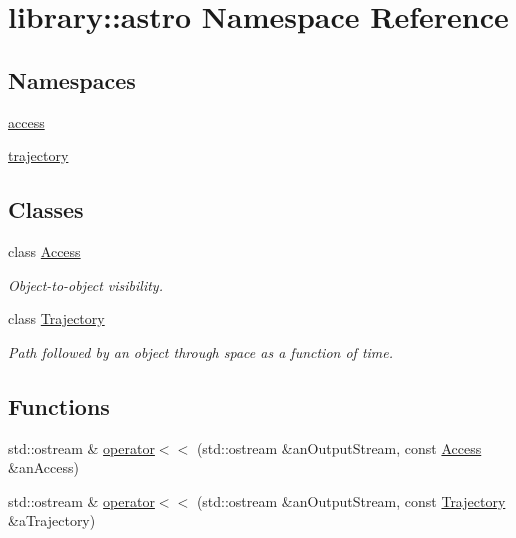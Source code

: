 \hypertarget{namespacelibrary_1_1astro}{}\section{library\+:\+:astro Namespace Reference}
\label{namespacelibrary_1_1astro}
\subsection*{Namespaces}
\begin{DoxyCompactItemize}
\item 
 \hyperlink{namespacelibrary_1_1astro_1_1access}{access}
\item 
 \hyperlink{namespacelibrary_1_1astro_1_1trajectory}{trajectory}
\end{DoxyCompactItemize}
\subsection*{Classes}
\begin{DoxyCompactItemize}
\item 
class \hyperlink{classlibrary_1_1astro_1_1_access}{Access}
\begin{DoxyCompactList}\small\item\em Object-\/to-\/object visibility. \end{DoxyCompactList}\item 
class \hyperlink{classlibrary_1_1astro_1_1_trajectory}{Trajectory}
\begin{DoxyCompactList}\small\item\em Path followed by an object through space as a function of time. \end{DoxyCompactList}\end{DoxyCompactItemize}
\subsection*{Functions}
\begin{DoxyCompactItemize}
\item 
std\+::ostream \& \hyperlink{namespacelibrary_1_1astro_ab4fd99fd3c7f57416718f2e851a85f89}{operator$<$$<$} (std\+::ostream \&an\+Output\+Stream, const \hyperlink{classlibrary_1_1astro_1_1_access}{Access} \&an\+Access)
\item 
std\+::ostream \& \hyperlink{namespacelibrary_1_1astro_ad08e7276c4e2a0a3e256b1d8a7a92d41}{operator$<$$<$} (std\+::ostream \&an\+Output\+Stream, const \hyperlink{classlibrary_1_1astro_1_1_trajectory}{Trajectory} \&a\+Trajectory)
\end{DoxyCompactItemize}


